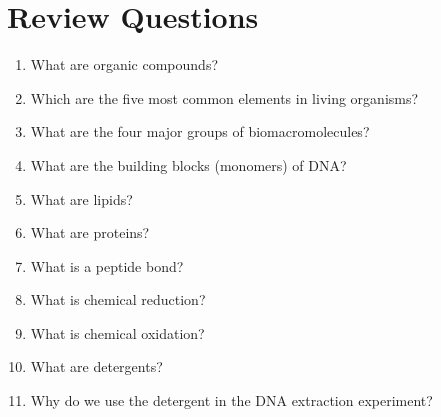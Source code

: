 \section{Review Questions}\label{review-questions-1}

\begin{enumerate}
\def\labelenumi{\arabic{enumi}.}
\tightlist
\item
  What are organic compounds?
\item
  Which are the five most common elements in living organisms?
\item
  What are the four major groups of biomacromolecules?
\item
  What are the building blocks (monomers) of DNA?
\item
  What are lipids?
\item
  What are proteins?
\item
  What is a peptide bond?
\item
  What is chemical reduction?
\item
  What is chemical oxidation?
\item
  What are detergents?
\item
  Why do we use the detergent in the DNA extraction experiment?
\end{enumerate}
